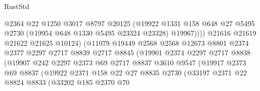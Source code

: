 \begin{lexlean}{RustStd}
\begin{coremodule}
                                  @2364
                                  @22
                                  @1250
                                  @3017
                                  @8797
                                  @20125
                                  (@19922
                                    @1331
                                    @158
                                    @648
                                    @27
                                    @5495
                                    @2730
                                    (@19954 @648 @1330 @5495 @23324 @23328)
                                    @19967))))
                            @21616
                            @21619
                            @21622
                            @21625
                            @10124)
                          (@11079
                            @19449
                            @2568
                            @2568
                            @12673
                            @8801
                            @2374
                            @2377
                            @2297
                            @2717
                            @8839
                            @2717
                            @8845
                            (@19901
                              @2374
                              @2297
                              @2717
                              @8838
                              (@19907
                                @242
                                @2297
                                @2373
                                @69
                                @2717
                                @8837
                                @3610
                                @9547
                                (@19917
                                  @2373
                                  @69
                                  @8837
                                  (@19922
                                    @2371
                                    @158
                                    @22
                                    @27
                                    @8835
                                    @2730
                                    (@33197
                                      @2371
                                      @22
                                      @8824
                                      @8833
                                      (@33202
                                        @185
                                        @2370
                                        @70

\end{coremodule}
\end{lexlean}
